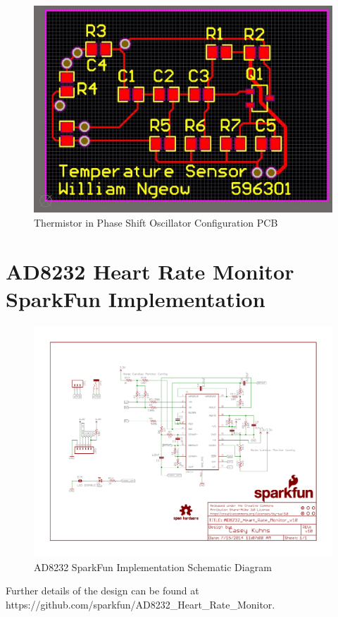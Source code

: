 \begin{figure}[H]
	\centering
	\includegraphics[width=0.8\linewidth]{psopcbnognd.jpg}
	\caption{Thermistor in Phase Shift Oscillator Configuration PCB}
\end{figure}

\section{AD8232 Heart Rate Monitor SparkFun Implementation}

\begin{figure}[H]
	\centering
	\includegraphics[width=1.05\linewidth]{AD8232_Heart_Rate_Monitor_v10.pdf}
	\caption{AD8232 SparkFun Implementation Schematic Diagram \cite{ad8232sfschematic}}
	\label{ad8232sfschematic}
\end{figure}

Further details of the design can be found at \\ https://github.com/sparkfun/AD8232\_Heart\_Rate\_Monitor.

